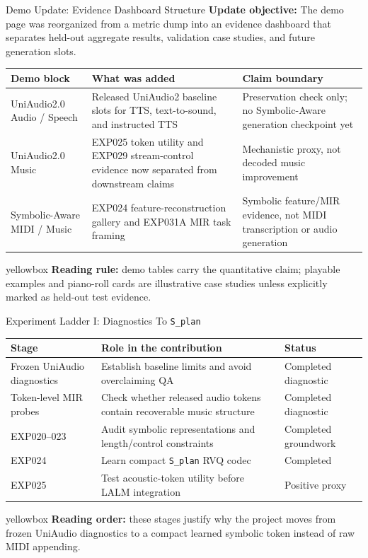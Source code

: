 \documentclass[aspectratio=169,11pt]{beamer}
\newcommand{\code}[1]{\texttt{\footnotesize #1}}
\newcommand{\expfield}[2]{\textbf{#1:} #2\par\vspace{0.10cm}}
\newenvironment{keybox}{%
  \begin{beamercolorbox}[rounded=true,sep=0.14cm,wd=\linewidth]{yellowbox}\footnotesize%
}{%
  \end{beamercolorbox}%
}
\begin{document}
\begin{frame}{Demo Update: Evidence Dashboard Structure}
  \footnotesize
  \expfield{Update objective}{The demo page was reorganized from a metric dump into an evidence dashboard that separates held-out aggregate results, validation case studies, and future generation slots.}

  \begin{tabularx}{\linewidth}{p{2.45cm}Yp{3.2cm}}
    \toprule
    Demo block & What was added & Claim boundary \\
    \midrule
    UniAudio2.0 Audio / Speech & Released UniAudio2 baseline slots for TTS, text-to-sound, and instructed TTS & Preservation check only; no Symbolic-Aware generation checkpoint yet \\
    UniAudio2.0 Music & EXP025 token utility and EXP029 stream-control evidence now separated from downstream claims & Mechanistic proxy, not decoded music improvement \\
    Symbolic-Aware MIDI / Music & EXP024 feature-reconstruction gallery and EXP031A MIR task framing & Symbolic feature/MIR evidence, not MIDI transcription or audio generation \\
    \bottomrule
  \end{tabularx}

  \vspace{0.2cm}
  \begin{keybox}\textbf{Reading rule:} demo tables carry the quantitative claim; playable examples and piano-roll cards are illustrative case studies unless explicitly marked as held-out test evidence.\end{keybox}
\end{frame}

\begin{frame}{Experiment Ladder I: Diagnostics To \code{S\_plan}}
  \footnotesize
  \begin{tabularx}{\linewidth}{p{2.75cm}Yp{2.45cm}}
    \toprule
    Stage & Role in the contribution & Status \\
    \midrule
    Frozen UniAudio diagnostics & Establish baseline limits and avoid overclaiming QA & Completed diagnostic \\
    Token-level MIR probes & Check whether released audio tokens contain recoverable music structure & Completed diagnostic \\
    EXP020--023 & Audit symbolic representations and length/control constraints & Completed groundwork \\
    EXP024 & Learn compact \code{S\_plan} RVQ codec & Completed \\
    EXP025 & Test acoustic-token utility before LALM integration & Positive proxy \\
    \bottomrule
  \end{tabularx}

  \vspace{0.18cm}
  \begin{keybox}\textbf{Reading order:} these stages justify why the project moves from frozen UniAudio diagnostics to a compact learned symbolic token instead of raw MIDI appending.\end{keybox}
\end{frame}
\end{document}
